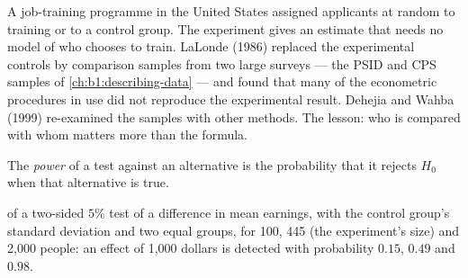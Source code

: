 \begin{record}
A job-training programme in the United States assigned
applicants at random to training or to a control group. The experiment
gives an estimate that needs no model of who chooses to train. LaLonde
(1986) replaced the experimental controls by comparison samples from
two large surveys --- the PSID and CPS samples of \cref{ch:b1:describing-data} --- and found
that many of the econometric procedures in use did not reproduce the
experimental result. %
Dehejia and Wahba (1999) re-examined the samples with other methods.
The lesson: who is compared with whom matters more than the formula.
\end{record}

\begin{definition}\label{def:b1:sampling-and-inference:power}
The \emph{power} of a test against an alternative is the probability that it
rejects $H_0$ when that alternative is true.
\end{definition}

\label{lst:b1:sampling-and-inference:power}

\label{out:b1:sampling-and-inference:power}

\begin{omfigure}

{\small {} of a two-sided $5\%$ test of a difference in mean earnings, with
the control group's standard deviation and two equal groups, for 100, 445 (the
experiment's size) and 2,000 people: an effect of 1,000 dollars is detected
with probability $0.15$, $0.49$ and $0.98$. %
}
\end{omfigure}

